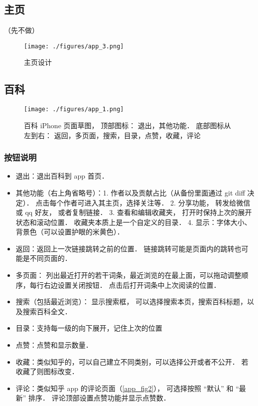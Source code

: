 
\begin{issues}
\issueDraft
\end{issues}

\subsection{主页}

（先不做）
\begin{figure}[ht]
\centering
\texttt{[image: ./figures/app\_3.png]}
\caption{主页设计} \label{app_fig3}
\end{figure}

\subsection{百科}
\begin{figure}[ht]
\centering
\texttt{[image: ./figures/app\_1.png]}
\caption{百科 iPhone 页面草图， 顶部图标： 退出，其他功能． 底部图标从左到右： 返回，多页面，搜索，目录，点赞，收藏，评论}\label{app_fig1}
\end{figure}

\subsubsection{按钮说明}
\begin{itemize}
\item 退出：退出百科到 app 首页．
\item 其他功能（右上角省略号）：1. 作者以及贡献占比（从备份里面通过 git diff 决定）． 点击每个作者可进入其主页，选择关注等． 2. 分享功能， 转发给微信或 qq 好友， 或者复制链接． 3. 查看和编辑收藏夹， 打开时保持上次的展开状态和滚动位置． 收藏夹本质上是一个自定义的目录． 4. 显示：字体大小、 背景色（可以设置护眼的米黄色）．
\item 返回：返回上一次链接跳转之前的位置． 链接跳转可能是页面内的跳转也可能是不同页面的．
\item 多页面： 列出最近打开的若干词条，最近浏览的在最上面，可以拖动调整顺序，每行右边设置关闭按钮． 点击后打开词条中上次阅读的位置．
\item 搜索（包括最近浏览）： 显示搜索框， 可以选择搜索本页，搜索百科标题，以及搜索百科全文．
\item 目录：支持每一级的向下展开，记住上次的位置
\item 点赞：点赞和显示数量．
\item 收藏：类似知乎的，可以自己建立不同类别，可以选择公开或者不公开． 若收藏了则图标改变．
\item 评论：类似知乎 app 的评论页面（\autoref{app_fig2}）， 可选择按照 “默认” 和 “最新” 排序． 评论顶部设置点赞功能并显示点赞数．
\end{itemize}

